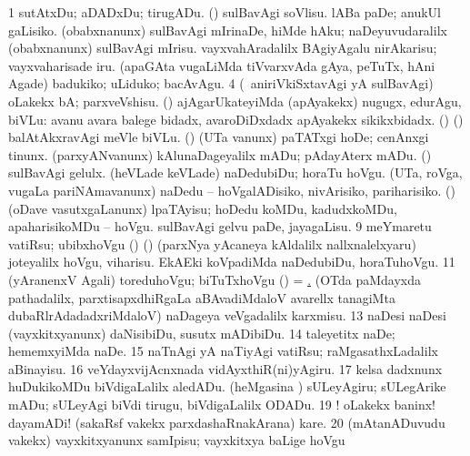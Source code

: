{\noindent 
\gl{\pagu}
\expl{}
\bmng
\bnum
\num{1}  sutAtxDu; aDADxDu; tirugADu. 
\hypertarget{walk pagu2}{} 
  (\AmA) 
\banum
{} sulBavAgi soVlisu. 
 lABa paDe; anukUl gaLisiko. 
\eanum
\numie
{}  
\banum
{} (obabxnanunx) sulBavAgi mIrinaDe, hiMde hAku; naDeyuvudaralilx (obabxnanunx) sulBavAgi mIrisu. 
 vayxvahAradalilx BAgiyAgalu nirAkarisu; vayxvaharisade iru. 
 (apaGAta \mo vugaLiMda tiVvarxvAda gAya, peTuTx, hAni Agade) badukiko; uLiduko; bacAvAgu. 
\eanum
\numie
\num{4}  (\kanmu\ aniriVkiSxtavAgi yA sulBavAgi) oLakekx bA; parxveVshisu. 
  
\banum
{} (\AmA) ajAgarUkateyiMda (apAyakekx) nugugx, edurAgu, biVLu:  avanu avara balege bidadx, avaroDiDxdadx apAyakekx sikikxbidadx. 
 (\ashi) (\pArxparx) balAtAkxravAgi meVle biVLu. 
 (\ashi) (UTa \mo vanunx) paTATxgi hoDe; cenAnxgi tinunx. 
\eanum
\numie
{}  
\banum
{} (parxyANvanunx) kAlunaDageyalilx mADu; pAdayAterx mADu. 
 (\AmA) sulBavAgi gelulx. 
\eanum
\numie
{}  
\banum
{} (heVLade keVLade) naDedubiDu; horaTu hoVgu. 
 (UTa, roVga, \mo vugaLa pariNAmavanunx) naDedu -- hoVgalADisiko, nivArisiko, pariharisiko. 
\eanum
\numie
{}  (\AmA) 
\banum
{} (oDave vasutxgaLanunx) lpaTAyisu; hoDedu koMDu, kadudxkoMDu, apaharisikoMDu -- hoVgu. 
 sulBavAgi gelvu paDe, jayagaLisu. 
\eanum
\numie
\num{9}  meYmaretu vatiRsu; ubibxhoVgu 
  
\banum
{} (\birx) (\pArxparx) (parxNya yAcaneya kAldalilx nallxnalelxyaru) joteyalilx hoVgu, viharisu. 
 EkAEki koVpadiMda naDedubiDu, horaTuhoVgu. 
\eanum
\numie
\num{11}  (yAranenxV Agali) toreduhoVgu; biTuTxhoVgu 
  
\banum
{} (\AmA) = \hyperlink{walk pagu2}{\pagu {}.} 
 (OTda paMdayxda pathadalilx, parxtisapxdhiRgaLa aBAvadiMdaloV avarellx tanagiMta dubaRlrAdadadxriMdaloV) naDageya veVgadalilx karxmisu. 
\eanum
\numie
\num{13}  naDesi naDesi (vayxkitxyanunx) daNisibiDu, susutx mADibiDu. 
\num{14}  taleyetitx naDe; hememxyiMda naDe. 
\num{15}  naTnAgi yA naTiyAgi vatiRsu; raMgasathxLadalilx aBinayisu. 
\num{16}  veYdayxvijAcnxnada vidAyxthiR(ni)yAgiru. 
\num{17}  
  
\banum
{} kelsa \mo dadxnunx huDukikoMDu biVdigaLalilx aledADu. 
 (heMgasina \vi) sULeyAgiru; sULegArike mADu; sULeyAgi biVdi tirugu, biVdigaLalilx ODADu. 
\eanum
\numie
\num{19} ! oLakekx baninx! dayamADi! (sakaRsf \mo vakekx parxdashaRnakArana) kare. 
\num{20}  (mAtanADuvudu \mo vakekx) vayxkitxyanunx samIpisu; vayxkitxya baLige hoVgu 
\enum
\emng
\eentry

}
